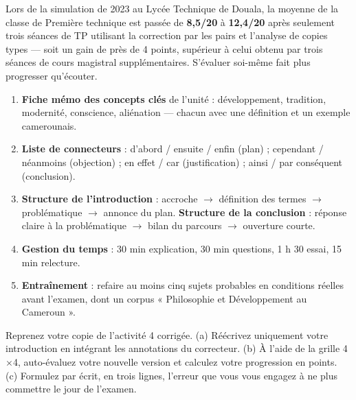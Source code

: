 \documentclass[11pt]{article}
\begin{document}
\begin{exemplebox}
Lors de la simulation de 2023 au Lycée Technique de Douala, la moyenne de la classe de Première technique est passée de \textbf{8,5/20} à \textbf{12,4/20} après seulement trois séances de TP utilisant la correction par les pairs et l'analyse de copies types — soit un gain de près de 4 points, supérieur à celui obtenu par trois séances de cours magistral supplémentaires. S'évaluer soi-même fait plus progresser qu'écouter.
\end{exemplebox}

\begin{aretenir}
\begin{enumerate}
\item \textbf{Fiche mémo des concepts clés} de l'unité : développement, tradition, modernité, conscience, aliénation — chacun avec une définition et un exemple camerounais.
\item \textbf{Liste de connecteurs} : d'abord / ensuite / enfin (plan) ; cependant / néanmoins (objection) ; en effet / car (justification) ; ainsi / par conséquent (conclusion).
\item \textbf{Structure de l'introduction} : accroche $\rightarrow$ définition des termes $\rightarrow$ problématique $\rightarrow$ annonce du plan. \textbf{Structure de la conclusion} : réponse claire à la problématique $\rightarrow$ bilan du parcours $\rightarrow$ ouverture courte.
\item \textbf{Gestion du temps} : 30 min explication, 30 min questions, 1 h 30 essai, 15 min relecture.
\item \textbf{Entraînement} : refaire au moins cinq sujets probables en conditions réelles avant l'examen, dont un corpus « Philosophie et Développement au Cameroun ».
\end{enumerate}
\end{aretenir}

\begin{exercice}
Reprenez votre copie de l'activité 4 corrigée. (a) Réécrivez uniquement votre introduction en intégrant les annotations du correcteur. (b) À l'aide de la grille 4$\times$4, auto-évaluez votre nouvelle version et calculez votre progression en points. (c) Formulez par écrit, en trois lignes, l'erreur que vous vous engagez à ne plus commettre le jour de l'examen.
\end{exercice}
\end{document}
